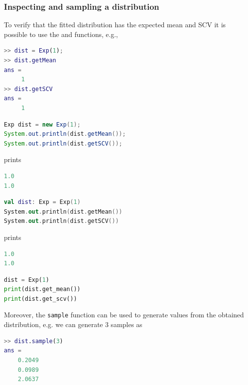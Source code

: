 \subsubsection{Inspecting and sampling a distribution}
To verify that the fitted distribution has the expected mean and SCV it is possible to use the  and  functions, e.g.,
\begin{MATLAB}
\begin{lstlisting}[language = matlab]
>> dist = Exp(1);
>> dist.getMean
ans =
     1
>> dist.getSCV
ans =
     1
\end{lstlisting}
\end{MATLAB}
\begin{JAVA}
\begin{lstlisting}[language = java, basicstyle=\ttfamily\scriptsize]
Exp dist = new Exp(1);
System.out.println(dist.getMean());
System.out.println(dist.getSCV());
\end{lstlisting}
prints
\begin{lstlisting}[language = java, basicstyle=\ttfamily\scriptsize]
1.0
1.0
\end{lstlisting}
\end{JAVA}
\begin{KOTLIN}
\begin{lstlisting}[language = kotlin, basicstyle=\ttfamily\scriptsize]
val dist: Exp = Exp(1)
System.out.println(dist.getMean())
System.out.println(dist.getSCV())
\end{lstlisting}
prints
\begin{lstlisting}[language = kotlin, basicstyle=\ttfamily\scriptsize]
1.0
1.0
\end{lstlisting}
\end{KOTLIN}
\begin{PYTHON}
\begin{lstlisting}[language=python]
dist = Exp(1)
print(dist.get_mean())
print(dist.get_scv())
\end{lstlisting}
\end{PYTHON}
Moreover, the \texttt{sample} function can be used to generate values from the obtained distribution, e.g. we can generate 3 samples as
\begin{MATLAB}
\begin{lstlisting}[language = matlab]
>> dist.sample(3)
ans =
    0.2049
    0.0989
    2.0637
\end{lstlisting}
\end{MATLAB}
